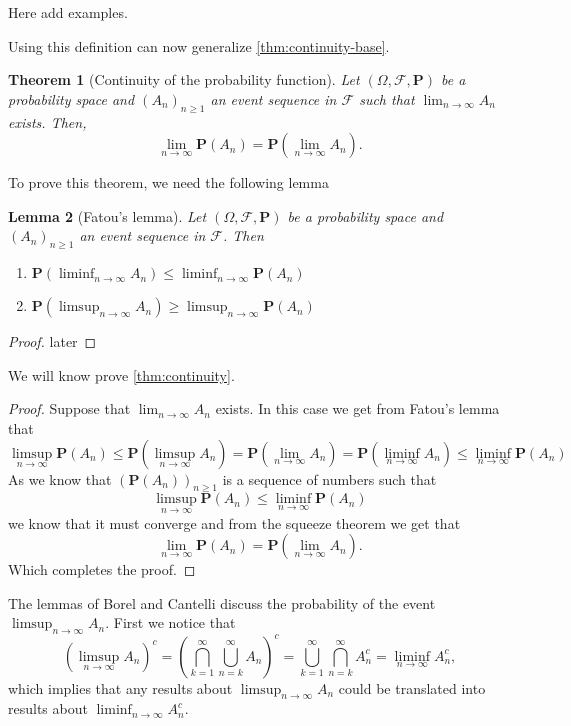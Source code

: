 \documentclass[11pt,a4paper]{article}
\theoremstyle{definition}
\theoremstyle{plain}
\newtheorem{theorem}{Theorem}[section]
\newtheorem{lemma}[theorem]{Lemma}
\newcommand{\Prob}{\mathbf{P}}
\begin{document}
  Here add examples.

  Using this definition can now generalize \autoref{thm:continuity-base}.
  \begin{theorem}[Continuity of the probability function]
  \label{thm:continuity}
    Let $(\Omega, \mathcal F, \Prob)$ be a probability space and
    $(A_n)_{n \geq 1}$ an event sequence in $\mathcal F$ such that
    $\lim_{n \to \infty} A_n$ exists. Then,
    \[
      \lim_{n \to \infty} \Prob(A_n) =
      \Prob\left(\lim_{n \to \infty} A_n\right).
    \]
  \end{theorem}
  
  To prove this theorem, we need the following lemma
  \begin{lemma}[Fatou's lemma]\label{lem:fatou}
    Let $(\Omega, \mathcal F, \Prob)$ be a probability space and
    $(A_n)_{n \geq 1}$ an event sequence in $\mathcal F$. Then
    \begin{enumerate}
      \item $\Prob\left(\liminf_{n \to \infty} A_n\right) \le
            \liminf_{n \to \infty} \Prob(A_n)$
      \item $\Prob\left(\limsup_{n \to \infty} A_n\right) \geq
            \limsup_{n \to \infty} \Prob(A_n)$
    \end{enumerate}
  \end{lemma}
  \begin{proof}
    later
  \end{proof}
  We will know prove \autoref{thm:continuity}.
  \begin{proof}
    Suppose that $\lim_{n \to \infty} A_n$ exists.
    In this case we get from Fatou's lemma that
    \[
      \limsup_{n \to \infty} \Prob(A_n) \le
      \Prob\left(\limsup_{n \to \infty} A_n\right) =
      \Prob\left(\lim_{n \to \infty} A_n\right) =
      \Prob\left(\liminf_{n \to \infty} A_n\right) \le
      \liminf_{n \to \infty} \Prob(A_n)
    \]
    As we know that $\left(\Prob(A_n)\right)_{n \geq 1}$ is a sequence of
    numbers such that
    \[
      \limsup_{n \to \infty} \Prob(A_n) \le \liminf_{n \to \infty} \Prob(A_n)
    \]
    we know that it must converge and from the squeeze theorem we get that
    \[
      \lim_{n \to \infty} \Prob(A_n) =
      \Prob\left(\lim_{n \to \infty} A_n\right).
    \]
    Which completes the proof.
  \end{proof}

  The lemmas of Borel and Cantelli discuss the probability of the
  event $\limsup_{n \to \infty} A_n$. First we notice that
  \[
    \left( \limsup_{n \to \infty} A_n \right)^c =
    \left(\bigcap_{k=1}^{\infty} \bigcup_{n=k}^{\infty} A_n\right)^c =
    \bigcup_{k=1}^{\infty} \bigcap_{n=k}^{\infty} A_n^c =
    \liminf_{n \to \infty} A_n^c,
  \]
  which implies that any results about $\limsup_{n \to \infty} A_n$ could
  be translated into results about $\liminf_{n \to \infty} A_n^c$.
\end{document}

